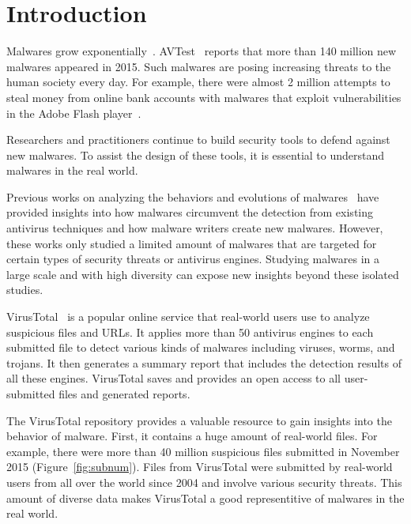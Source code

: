 
\section{Introduction}

Malwares grow exponentially~\cite{avtest}. 
AVTest~\cite{avtest} reports that more than 140 million new malwares appeared in 2015. 
Such malwares are posing increasing threats to the human society every day. 
For example, there were almost 2 million attempts to 
steal money from online bank accounts 
with malwares that exploit vulnerabilities in the Adobe Flash player~\cite{kaspersky}. 

Researchers and practitioners continue to build security tools to defend against new malwares.
To assist the design of these tools, it is essential to understand malwares in the real world. 

Previous works on analyzing the behaviors and evolutions of malwares~\cite{ZhouSP2012,GuptaComsnets2009} 
have provided insights 
into how malwares circumvent the detection from existing antivirus techniques and how malware writers create new malwares. 
However, these works only studied a limited amount of malwares that are targeted for certain types of security threats or antivirus engines.
Studying malwares in a large scale and with high diversity can expose new insights beyond these isolated studies.

VirusTotal~\cite{virustotal} is a popular online service that real-world users use to analyze suspicious files and URLs.
It applies more than 50 antivirus engines to each submitted file 
to detect various kinds of malwares including viruses, worms, and trojans. 
It then generates a summary report that includes the detection results of all these engines. 
VirusTotal saves and provides an open access to all user-submitted files and generated reports. 

The VirusTotal repository provides a valuable resource to gain insights into 
the behavior of malware.
%
First, it contains a huge amount of real-world files.
For example, there were more than 40 million suspicious files submitted in November 2015 (Figure~\ref{fig:subnum}). 
Files from VirusTotal were submitted by real-world users from all over the world since 2004
and involve various security threats. 
This amount of diverse data makes VirusTotal a good representitive of malwares in the real world. 

